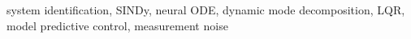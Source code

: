 system identification, SINDy, neural ODE, dynamic mode decomposition, LQR, model predictive control, measurement noise
